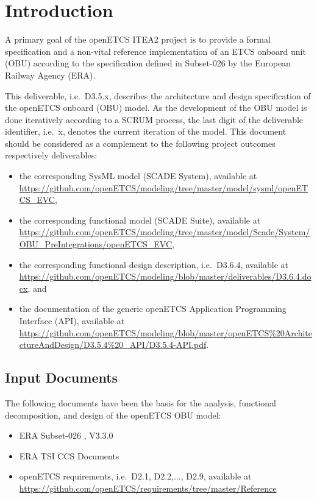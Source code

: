 
\chapter{Introduction}

A primary goal of the openETCS ITEA2 project is to provide a formal specification and a non-vital reference implementation of an ETCS onboard unit (OBU) according to the specification defined in Subset-026 \cite{subset-026} by the European Railway Agency (ERA). 

This deliverable, i.e.~D3.5.x, describes the architecture and design specification of the openETCS onboard (OBU) model. As the development of the OBU model is done iteratively according to a SCRUM process, the last digit of the deliverable identifier, i.e.~x, denotes the current iteration of the model. This document should be considered as a complement to the following project outcomes respectively deliverables:
\begin{itemize}
\item the corresponding SysML model (SCADE System), available at \url{https://github.com/openETCS/modeling/tree/master/model/sysml/openETCS_EVC},
\item the corresponding functional model (SCADE Suite), available at \url{https://github.com/openETCS/modeling/tree/master/model/Scade/System/OBU_PreIntegrations/openETCS_EVC},
\item the corresponding functional design description, i.e.~D3.6.4, available at \url{https://github.com/openETCS/modeling/blob/master/deliverables/D3.6.4.docx}, and
\item the documentation of the generic openETCS Application Programming Interface (API), available at \url{https://github.com/openETCS/modeling/blob/master/openETCS%20ArchitectureAndDesign/D3.5.4%20_API/D3.5.4-API.pdf}.
\end{itemize}


\section{Input Documents}

The following documents have been the basis for the analysis, functional decomposition, and design of the openETCS OBU model:
\begin{itemize}
\item ERA Subset-026 \cite{subset-026}, V3.3.0
\item ERA TSI CCS Documents
\item openETCS requirements, i.e.~D2.1, D2.2,$\ldots$, D2.9, available at \url{https://github.com/openETCS/requirements/tree/master/Reference}
\end{itemize}


